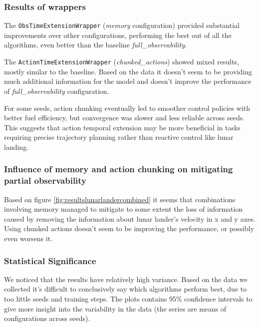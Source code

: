 \documentclass[12pt, a4paper]{article}
\begin{document}
\subsubsection{Results of wrappers}

The \texttt{ObsTimeExtensionWrapper} (\textit{memory} configuration) provided substantial improvements over other configurations, performing the best out of all the algorithms, even better than the baseline \textit{full\_observability}. 

The \texttt{ActionTimeExtensionWrapper} (\textit{chunked\_actions}) showed mixed results, mostly similar to the baseline. Based on the data it doesn't seem to be providing much additional information for the model and doesn't improve the performance of \textit{full\_observability} configuration. 

For some seeds, action chunking eventually led to smoother control policies with better fuel efficiency, but convergence was slower and less reliable across seeds. This suggests that action temporal extension may be more beneficial in tasks requiring precise trajectory planning rather than reactive control like lunar landing.

\subsubsection{Influence of memory and action chunking on mitigating partial observability}
Based on figure \ref{fig:resultslunarlandercombined} it seems that combinations involving memory managed to mitigate to some extent the loss of information caused by removing the information about lunar lander's velocity in x and y axes. Using chunked actions doesn't seem to be improving the performance, or possibly even worsens it.


\subsubsection{Statistical Significance}
We noticed that the results have relatively high variance. Based on the data we collected it's difficult to conclusively say which algorithms perform best, due to too little seeds and training steps. The plots contains 95\% confidence intervals to give more insight into the variability in the data (the series are means  of configurations across seeds).
\end{document}
